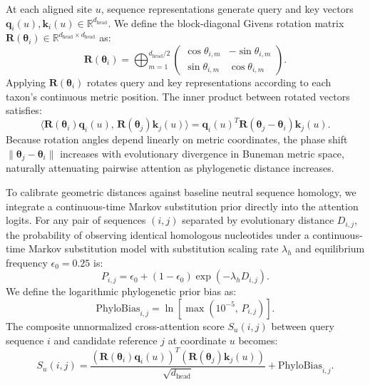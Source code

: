 At each aligned site $u$, sequence representations generate query and key vectors $\mathbf{q}_i(u), \mathbf{k}_i(u) \in \mathbb{R}^{d_{\text{head}}}$.
We define the block-diagonal Givens rotation matrix $\mathbf{R}(\bm{\theta}_i) \in \mathbb{R}^{d_{\text{head}} \times d_{\text{head}}}$ as:
\begin{equation}
\mathbf{R}(\bm{\theta}_i) = \bigoplus_{m=1}^{d_{\text{head}}/2} \begin{pmatrix} \cos \theta_{i, m} & -\sin \theta_{i, m} \\ \sin \theta_{i, m} & \cos \theta_{i, m} \end{pmatrix}.
\label{eq:methods_givens_rot}
\end{equation}
Applying $\mathbf{R}(\bm{\theta}_i)$ rotates query and key representations according to each taxon's continuous metric position.
The inner product between rotated vectors satisfies:
\begin{equation}
\langle \mathbf{R}(\bm{\theta}_i) \mathbf{q}_i(u), \, \mathbf{R}(\bm{\theta}_j) \mathbf{k}_j(u) \rangle = \mathbf{q}_i(u)^T \mathbf{R}(\bm{\theta}_j - \bm{\theta}_i) \mathbf{k}_j(u).
\label{eq:methods_rot_inner}
\end{equation}
Because rotation angles depend linearly on metric coordinates, the phase shift $\|\bm{\theta}_j - \bm{\theta}_i\|$ increases with evolutionary divergence in Buneman metric space, naturally attenuating pairwise attention as phylogenetic distance increases.

To calibrate geometric distances against baseline neutral sequence homology, we integrate a continuous-time Markov substitution prior directly into the attention logits.
For any pair of sequences $(i, j)$ separated by evolutionary distance $D_{i,j}$, the probability of observing identical homologous nucleotides under a continuous-time Markov substitution model with substitution scaling rate $\lambda_h$ and equilibrium frequency $\epsilon_0 = 0.25$ is:
\begin{equation}
P_{i, j} = \epsilon_0 + (1 - \epsilon_0) \exp\left(-\lambda_h D_{i, j}\right).
\label{eq:methods_markov_prior}
\end{equation}
We define the logarithmic phylogenetic prior bias as:
\begin{equation}
\text{PhyloBias}_{i, j} = \ln \left[ \max\left(10^{-5}, \, P_{i, j}\right) \right].
\label{eq:methods_phylobias}
\end{equation}
The composite unnormalized cross-attention score $S_u(i, j)$ between query sequence $i$ and candidate reference $j$ at coordinate $u$ becomes:
\begin{equation}
S_u(i, j) = \frac{(\mathbf{R}(\bm{\theta}_i) \mathbf{q}_i(u))^T (\mathbf{R}(\bm{\theta}_j) \mathbf{k}_j(u))}{\sqrt{d_{\text{head}}}} + \text{PhyloBias}_{i, j}.
\label{eq:methods_composite_score}
\end{equation}

